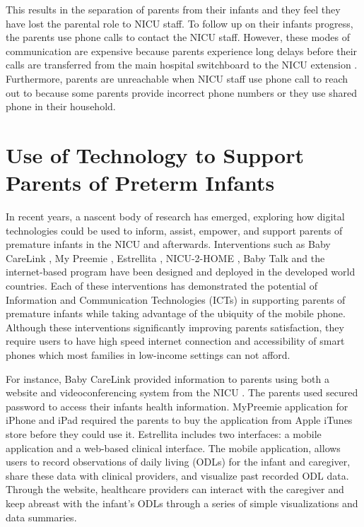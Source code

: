 This results in the separation of parents from their infants and they feel they have lost the parental role to NICU staff. To follow up on their infants progress, the parents use phone calls to contact the NICU staff. However, these modes of communication are expensive because parents experience long delays before their calls are transferred from the main hospital switchboard to the NICU extension \textcite{Mburu2018}. Furthermore, parents are unreachable when NICU staff use phone call to reach out to because some parents provide incorrect phone numbers or they use shared phone in their household.

\section{Use of Technology to Support Parents of Preterm Infants}
In recent years, a nascent body of research has emerged, exploring  how digital technologies could be used to inform, assist, empower, and support parents of premature infants in the NICU and afterwards. Interventions such as Baby CareLink \textcite{Gray2000}, My Preemie \textcite{Doron2013}, Estrellita \textcite{Hayes2014}, NICU-2-HOME \textcite{Garfield2014}, Baby Talk \textcite{Mahamood2011} and the internet-based program \textcite{Lindberg2012a} have been designed and deployed in the developed world countries. Each of these interventions has demonstrated the potential of Information and Communication Technologies (ICTs) in supporting parents of premature infants while taking advantage of the ubiquity of the mobile phone. Although these interventions significantly improving  parents satisfaction, they require users to have high speed internet connection and accessibility of smart phones which most families in low-income settings can not afford. 

For instance, Baby CareLink provided information to parents using  both a website and videoconferencing system from the NICU \textcite{Gray2000a}. The parents used secured password to access their infants health information. MyPreemie application \textcite{Doron2013} for iPhone and iPad required the parents to buy the application from Apple iTunes store before they could use it. Estrellita \textcite{Hayes2014} includes two interfaces: a mobile application and a web-based clinical interface. The mobile application, allows users to record observations of daily living (ODLs) for the infant and caregiver, share these data with clinical providers, and visualize past recorded ODL data. Through the website, healthcare providers can interact with the caregiver and keep abreast with the infant’s ODLs through a series of simple visualizations and data summaries.

